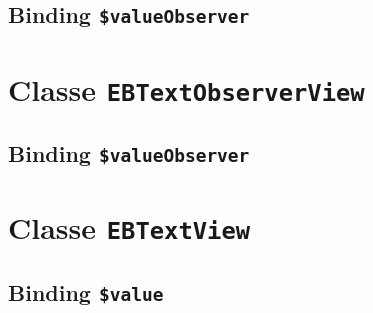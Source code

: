 \subsection{Binding \texttt{\$valueObserver}}








\section{Classe \texttt{EBTextObserverView}}

\subsection{Binding \texttt{\$valueObserver}}








\section{Classe \texttt{EBTextView}}

\subsection{Binding \texttt{\$value}}








